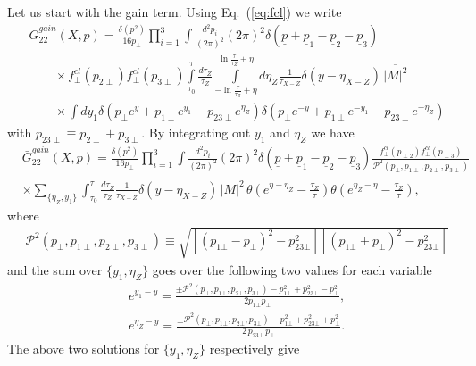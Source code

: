 \documentclass[onecolumn,showpacs,nobibnotes,nofootinbib,12pt,aps,prd,showpacs,notitlepage,nofootinbib,preprintnumbers,amsmath,amssymb]{article}
\def\eq#1{{Eq.~(\ref{#1})}}
\begin{document}
Let us start with the gain term. Using \eq{eq:fcl} we write
\begin{align}
  &\bar G_{22}^{gain}(X,p)=\frac{\delta(p^2)}{16p_\perp}\prod\limits_{i=1}^3\int\frac{d^2 p_i}{(2\pi)^2}(2\pi)^2\delta(\underline{p}+\underline{p}_1-\underline{p}_2-\underline{p}_3)\nonumber\\
  &\qquad\times f_\perp^{cl}(p_{2\perp})f_\perp^{cl}(p_{3\perp}) \int\limits_{\tau_0}^\tau \frac{d\tau_Z}{\tau_Z} \int\limits_{-\ln\frac{\tau}{\tau_Z}+\eta}^{\ln\frac{\tau}{\tau_Z}+\eta} d\eta_Z\frac{1}{\tau_{X-Z}}\delta(y-\eta_{X-Z}) \, \overline{|M|^2}\nonumber\\
  &\qquad\times\int d y_1 \delta(p_\perp e^{y}+p_{1\perp}
  e^{y_1}-p_{23\perp}e^{\eta_Z})\delta(p_\perp e^{-y}+p_{1\perp}
  e^{-y_1}-p_{23\perp}e^{-\eta_Z})\label{eq:G22gaintau}
\end{align}
with $p_{23\perp}\equiv p_{2\perp}+p_{3\perp}$.
By integrating out $y_1$ and $\eta_Z$ we have
\begin{align}
  &\bar G_{22}^{gain}(X,p)=\frac{\delta(p^2)}{16p_\perp}\prod\limits_{i=1}^3\int\frac{d^2{p}_i}{(2\pi)^2}(2\pi)^2\delta(\underline{p}+\underline{p}_1-\underline{p}_2-\underline{p}_3)\frac{f_\perp^{cl}(p_{\perp2})f_\perp^{cl}(p_{\perp3})}{\mathcal{P}^2(p_\perp,p_{1\perp}, p_{2\perp}, p_{3\perp})}\nonumber\\
  &\times\sum_{\{\eta_Z,y_1\}}\int_{\tau_0}^\tau
  \frac{d\tau_Z}{\tau_Z}\frac{1}{\tau_{X-Z}}\delta(y-\eta_{X-Z}) \,
  \overline{|M|^2} \,
  \theta\left(e^{\eta-\eta_Z}-\frac{\tau_Z}{\tau}\right)\theta\left(e^{\eta_Z-\eta}-\frac{\tau_Z}{\tau}\right), \label{eq:G22gaintau2}
\end{align}
where
\begin{align}
  &\mathcal{P}^2(p_\perp,p_{1\perp}, p_{2\perp}, p_{3\perp})\equiv \sqrt{[(p_{1\bot }-p_{\bot })^2-p_{23\bot }^2][(p_{1\bot }+p_{\bot })^2-p_{23\bot }^2]}
\end{align}
and the sum over $\{y_1, \eta_Z\}$ goes over the following two values
for each variable
\begin{align}
  &e^{y_1-y}= \frac{ \pm \mathcal{P}^2\left(p_{\bot },p_{1\bot },p_{2\bot },p_{3\bot }\right)-p_{1\bot }^2 + p_{23\bot}^2-p_{\bot }^2}{2 p_{1\bot } p_{\bot }},\nonumber\\
  &e^{\eta _Z-y}= \frac{\pm \mathcal{P}^2\left(p_{\bot },p_{1\bot
      },p_{2\bot },p_{3\bot }\right)-p_{1\bot }^2 +
    p_{23\bot}^2+p_{\bot }^2}{2 \, p_{23\bot } \, p_{\bot
    }}. \label{eq:eZy101}
\end{align}
The above two solutions for $\{y_1,\eta_Z\}$ respectively give
\end{document}
